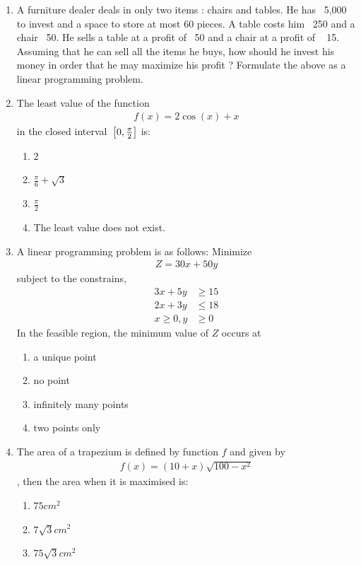 \begin{enumerate}
 \item A furniture dealer deals in only two items : chairs and tables. He has \rupee~5,000  to invest and a space to store at most $60$ pieces. A table costs him \rupee~250 and a chair \rupee~50. He sells a table at a profit of \rupee~50 and a chair at
a profit of \rupee~ 15. Assuming that he can sell all the items he buys, how should he invest his money in order that he may maximize his profit ?
Formulate the above as a linear programming problem.
\item The least value of the function 
\begin{align}
	f(x)=2\cos(x) + x
\end{align}
		in the closed interval ${}\left[0, \frac{\pi}{2}\right]$ is: 
\begin{enumerate}
    \item  $2$
    \item  $\frac{\pi}{6} + \sqrt{3}$
    \item  $\frac{\pi}{2}$
    \item The least value does not exist.
\end{enumerate}
\item A linear programming problem is as follows:
Minimize 
\begin{align}
	Z=30x+50y 
\end{align}
		subject to the constrains,
\begin{align}
	3x+5y &\geq 15\\
	2x+3y &\leq 18\\
	x \geq 0, y &\geq 0
\end{align}
In the feasible region, the minimum value of $Z$ occurs at 
\begin{enumerate}
    \item a unique point 
    \item no point
    \item infinitely many points 
    \item two points only
\end{enumerate}
\item The area of a trapezium is defined by function $f$
and given by 
\begin{align}
	f(x)=(10+x)\sqrt{100-x^2}
\end{align}
			, then the area when it is maximised is:
\begin{enumerate}
    \item $75cm^2$
    \item $7\sqrt{3}cm^2$
    \item $75\sqrt{3}cm^2$

\end{enumerate}
\end{enumerate}
